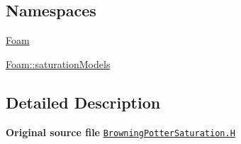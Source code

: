 \subsection*{Namespaces}
\begin{DoxyCompactItemize}
\item 
 \hyperlink{namespaceFoam}{Foam}
\item 
 \hyperlink{namespaceFoam_1_1saturationModels}{Foam\+::saturation\+Models}
\end{DoxyCompactItemize}


\subsection{Detailed Description}
{\bfseries Original source file} \href{../../../home/carlo/data/GeN-Foam/GeN-Foam_ffn/GeN-Foam/GeN-Foam/classes/thermalHydraulics/src/physicsModels/phaseChangeModels/saturationModels/BrowningPotter/BrowningPotterSaturation.H}{\tt Browning\+Potter\+Saturation.\+H} 